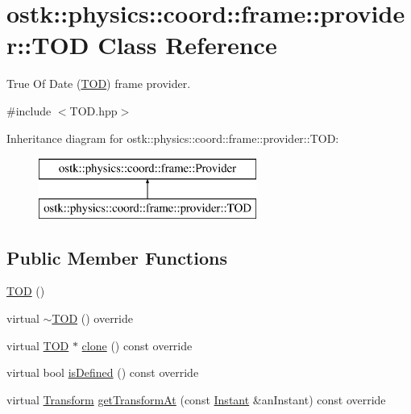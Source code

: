 \hypertarget{classostk_1_1physics_1_1coord_1_1frame_1_1provider_1_1_t_o_d}{}\section{ostk\+:\+:physics\+:\+:coord\+:\+:frame\+:\+:provider\+:\+:T\+OD Class Reference}
\label{classostk_1_1physics_1_1coord_1_1frame_1_1provider_1_1_t_o_d}


True Of Date (\hyperlink{classostk_1_1physics_1_1coord_1_1frame_1_1provider_1_1_t_o_d}{T\+OD}) frame provider.  




{\ttfamily \#include $<$T\+O\+D.\+hpp$>$}

Inheritance diagram for ostk\+:\+:physics\+:\+:coord\+:\+:frame\+:\+:provider\+:\+:T\+OD\+:\begin{figure}[H]
\begin{center}
\leavevmode
\includegraphics[height=2.000000cm]{classostk_1_1physics_1_1coord_1_1frame_1_1provider_1_1_t_o_d}
\end{center}
\end{figure}
\subsection*{Public Member Functions}
\begin{DoxyCompactItemize}
\item 
\hyperlink{classostk_1_1physics_1_1coord_1_1frame_1_1provider_1_1_t_o_d_a8932522af5d9121ab0168c11428b0c81}{T\+OD} ()
\item 
virtual \hyperlink{classostk_1_1physics_1_1coord_1_1frame_1_1provider_1_1_t_o_d_a1e59c3f3d3d31e768deb99abb502b577}{$\sim$\+T\+OD} () override
\item 
virtual \hyperlink{classostk_1_1physics_1_1coord_1_1frame_1_1provider_1_1_t_o_d}{T\+OD} $\ast$ \hyperlink{classostk_1_1physics_1_1coord_1_1frame_1_1provider_1_1_t_o_d_ad374cdce01f5872311b61695502dd4e4}{clone} () const override
\item 
virtual bool \hyperlink{classostk_1_1physics_1_1coord_1_1frame_1_1provider_1_1_t_o_d_a57f8d993ac693b2cd39b4a99faadc92f}{is\+Defined} () const override
\item 
virtual \hyperlink{classostk_1_1physics_1_1coord_1_1_transform}{Transform} \hyperlink{classostk_1_1physics_1_1coord_1_1frame_1_1provider_1_1_t_o_d_adc74a9cba68df62bf135f5ee775bd4a1}{get\+Transform\+At} (const \hyperlink{classostk_1_1physics_1_1time_1_1_instant}{Instant} \&an\+Instant) const override
\end{DoxyCompactItemize}


